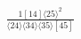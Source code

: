 \documentclass[varwidth, border=5pt]{standalone}
\begin{document}
\begin{my}
$\begin{gathered}
\scriptscriptstyle\frac{1[14]⟨25⟩^2}{⟨24⟩⟨34⟩⟨35⟩[45]}
\end{gathered}$
\end{my}
\end{document}
